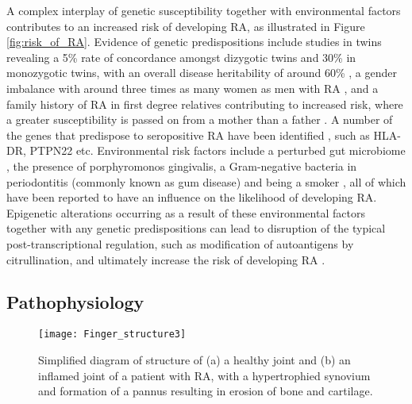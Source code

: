 \documentclass[twoside]{bhamthesis}
\theoremstyle{definition}
\begin{document}
A complex interplay of genetic susceptibility together with environmental factors contributes to an increased risk of developing RA, as illustrated in Figure \ref{fig:risk_of_RA}. Evidence of genetic predispositions include studies in twins revealing a 5\% rate of concordance amongst dizygotic twins and 30\% in monozygotic twins, with an overall disease heritability of around 60\% \cite{macgregor2000characterizing}, a gender imbalance with around three times as many women as men with RA \cite{van2009sex}, and a family history of RA in first degree relatives contributing to increased risk, where a greater susceptibility is passed on from a mother than a father \cite{koumantaki1997family}. A number of the genes that predispose to seropositive RA have been identified \cite{kim2017update}, such as HLA-DR, PTPN22 etc. Environmental risk factors include a perturbed gut microbiome \cite{zhang2015oral}, the presence of porphyromonos gingivalis, a Gram-negative bacteria in periodontitis (commonly known as gum disease) \cite{mikuls2014periodontitis} and being a smoker \cite{klareskog2006new}, all of which have been reported to have an influence on the likelihood of developing RA. Epigenetic alterations occurring as a result of these environmental factors together with any genetic predispositions can lead to disruption of the typical post-transcriptional regulation, such as modification of autoantigens by citrullination, and ultimately increase the risk of developing RA \cite{mcinnes2011pathogenesis}.

\subsection{Pathophysiology}

\label{section:Pathophysiology}

\begin{figure}[!ht]
\centering\texttt{[image: Finger\_structure3]}
\caption{Simplified diagram of structure of (a) a healthy joint and (b) an  inflamed joint of a patient with RA, with a hypertrophied synovium  and formation of a pannus resulting in erosion of bone and cartilage.}
\label{fig:Diagram_of_joints}
\end{figure}
\end{document}
